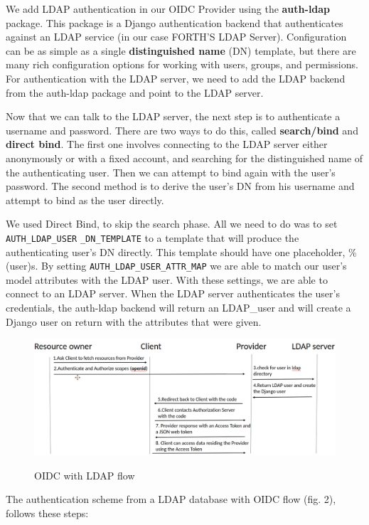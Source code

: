 We add LDAP authentication in our OIDC Provider using the \textbf{auth-ldap} \cite{ldapauth} package. This package is a Django authentication backend that authenticates against an LDAP service (in our case FORTH'S LDAP Server). Configuration can be as simple as a single \textbf{distinguished name} (DN) template, but there are many rich configuration options for working with users, groups, and permissions. For authentication with the LDAP server, we need to add the LDAP backend from the auth-ldap package and point to the LDAP server.

Now that we can talk to the LDAP server, the next step is to authenticate a username and password. There are two ways to do this, called \textbf{search/bind} and \textbf{direct bind}. The first one involves connecting to the LDAP server either anonymously or with a fixed account, and searching for the distinguished name of the authenticating user. Then we can attempt to bind again with the user’s password. The second method is to derive the user’s DN from his username and attempt to bind as the user directly.

We used Direct Bind, to skip the search phase. All we need to do was to set \verb|AUTH_LDAP_USER| \verb|_DN_TEMPLATE| to a template that will produce the authenticating user’s DN directly. This template should have one placeholder, \%(user)s. By setting \verb|AUTH_LDAP_USER_ATTR_MAP| we are able to match our user's model attributes with the LDAP user.
With these settings, we are able to connect to an LDAP server. When the LDAP server authenticates the user's credentials, the auth-ldap backend will return an LDAP\_user and will create a Django user on return with the attributes that were given.

\begin{figure}[htb]
	\centering
	\includegraphics[scale=0.3]{figures/LDAP.png}\\
	\caption{OIDC with LDAP flow}
\end{figure}

The authentication scheme from a LDAP database with OIDC flow (fig. 2), follows these steps:

